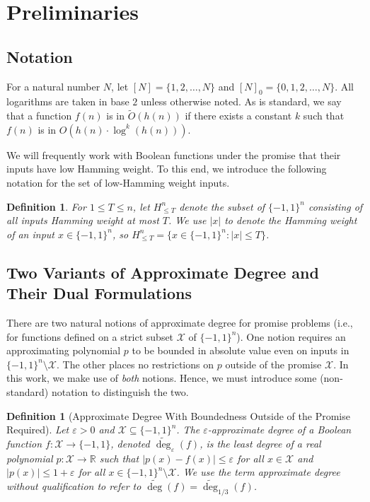 \documentclass[11pt, letterpaper, fleqn]{article}
\newtheorem{definition}[theorem]{Definition}
\theoremstyle{plain}
\newcommand{\R}{\mathbb{R}}
\newcommand{\bits}{\{-1,1\}}
\newcommand{\cX}{\mathcal{X}}
\newcommand{\eps}{\varepsilon}
\newcommand{\adeg}{\widetilde{\operatorname{deg}}}
\begin{document}

\section{Preliminaries}
\label{s:prelims}

\subsection{Notation}


For a natural number $N$, let $[N] = \{1, 2, \dots, N\}$ and $[N]_0 = \{0, 1, 2, \dots, N\}$. All logarithms are taken in base $2$ unless otherwise noted.
As is standard, we say that a function $f(n)$ is in $\tilde{O}(h(n))$ if there exists a constant $k$ such that $f(n)$ is in $O(h(n) \cdot \log^k(h(n)))$. 

We will frequently work with Boolean functions under the promise that their inputs have low Hamming weight. To this end, we introduce the following notation for the set of low-Hamming weight inputs.

\begin{definition} \label{def:ht} 
For $1 \le T \le n$, let $H^n_{\leq T}$ denote the subset of $\bits^n$
consisting of all inputs Hamming weight at most $T$. We use 
$|x|$ to denote the Hamming weight of an input $x \in \bits^n$,
so $H^n_{\leq T} = \{x \in \bits^n \colon |x| \leq T\}$. 
\end{definition}





\subsection{Two Variants of Approximate Degree and Their
Dual Formulations} 
There are two natural notions of approximate degree for promise problems
(i.e., for functions defined on a strict subset $\mathcal{X}$ of  $\bits^n$). 
One notion requires an approximating polynomial $p$ to be bounded
in absolute value even on inputs in $\bits^n \setminus \mathcal{X}$. 
The other places no restrictions on $p$ outside of the promise $\mathcal{X}$. 
In this work, we make use of \emph{both} notions. Hence, we must introduce 
some (non-standard) notation
to distinguish the two. 

\begin{definition}[Approximate Degree With Boundedness Outside of the Promise Required]
Let $\eps > 0$ and $\cX \subseteq \bits^n$. The $\eps$-\emph{approximate degree} of a Boolean function $f : \cX \to \bits$, denoted $\adeg_\eps(f)$, is the least degree of a real polynomial $p : \cX \to \R$ such that $|p(x) - f(x)| \le \eps$ for all $x \in \cX$ and $|p(x)| \le 1 + \eps$ for all $x \in \bits^n \setminus \cX$. We use the term \emph{approximate degree} without qualification to refer to $\adeg(f) = \adeg_{1/3}(f)$.
\end{definition}
\end{document}
